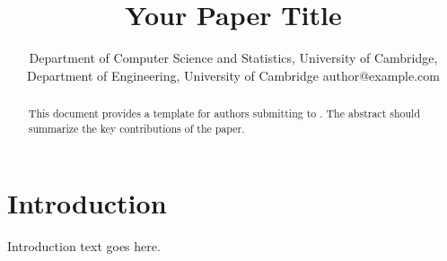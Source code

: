 \documentclass{article}
\title{Your Paper Title}
\author{\customauthor{Viviana Bastidas, Christian Cabrera} {Department of Computer Science and Statistics, University of Cambridge, Department of Engineering, University of Cambridge} {author@example.com}}
\date{}
\begin{document}
\maketitle

\begin{abstract}
This document provides a template for authors submitting to \confname. The abstract should summarize the key contributions of the paper.
\end{abstract}


\section{Introduction}
Introduction text goes here.




\end{document}
